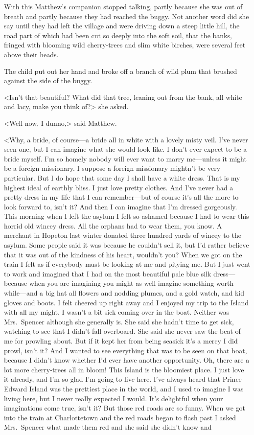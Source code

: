 With this Matthew's companion stopped talking, partly because she was out of breath and partly because they had reached the buggy. Not another word did she say until they had left the village and were driving down a steep little hill, the road part of which had been cut so deeply into the soft soil, that the banks, fringed with blooming wild cherry-trees and slim white birches, were several feet above their heads.

The child put out her hand and broke off a branch of wild plum that brushed against the side of the buggy.

<Isn't that beautiful? What did that tree, leaning out from the bank, all white and lacy, make you think of?> she asked.

<Well now, I dunno,> said Matthew.

<Why, a bride, of course—a bride all in white with a lovely misty veil. I've never seen one, but I can imagine what she would look like. I don't ever expect to be a bride myself. I'm so homely nobody will ever want to marry me—unless it might be a foreign missionary. I suppose a foreign missionary mightn't be very particular. But I do hope that some day I shall have a white dress. That is my highest ideal of earthly bliss. I just love pretty clothes. And I've never had a pretty dress in my life that I can remember—but of course it's all the more to look forward to, isn't it? And then I can imagine that I'm dressed gorgeously. This morning when I left the asylum I felt so ashamed because I had to wear this horrid old wincey dress. All the orphans had to wear them, you know. A merchant in Hopeton last winter donated three hundred yards of wincey to the asylum. Some people said it was because he couldn't sell it, but I'd rather believe that it was out of the kindness of his heart, wouldn't you? When we got on the train I felt as if everybody must be looking at me and pitying me. But I just went to work and imagined that I had on the most beautiful pale blue silk dress—because when you are imagining you might as well imagine something worth while—and a big hat all flowers and nodding plumes, and a gold watch, and kid gloves and boots. I felt cheered up right away and I enjoyed my trip to the Island with all my might. I wasn't a bit sick coming over in the boat. Neither was Mrs.~Spencer although she generally is. She said she hadn't time to get sick, watching to see that I didn't fall overboard. She said she never saw the beat of me for prowling about. But if it kept her from being seasick it's a mercy I did prowl, isn't it? And I wanted to see everything that was to be seen on that boat, because I didn't know whether I'd ever have another opportunity. Oh, there are a lot more cherry-trees all in bloom! This Island is the bloomiest place. I just love it already, and I'm so glad I'm going to live here. I've always heard that Prince Edward Island was the prettiest place in the world, and I used to imagine I was living here, but I never really expected I would. It's delightful when your imaginations come true, isn't it? But those red roads are so funny. When we got into the train at Charlottetown and the red roads began to flash past I asked Mrs.~Spencer what made them red and she said she didn't know and 